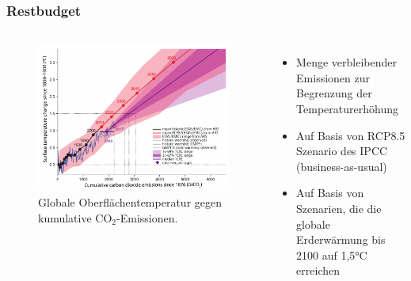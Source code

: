 \begin{frame}
  \frametitle{Restbudget}
  \begin{columns}
      \begin{figure}
        \centering
		    \includegraphics[width=\linewidth]{bilder/cumulative_co2.pdf}
		    \caption{Globale Oberflächentemperatur gegen kumulative CO$_2$-Emissionen.}
      \end{figure}
      \begin{itemize}
        \item Menge verbleibender Emissionen zur Begrenzung der Temperaturerhöhung
        \item Auf Basis von RCP8.5 Szenario des IPCC (business-as-usual)
        \item Auf Basis von Szenarien, die die globale Erderwärmung bis 2100 auf 1,5°C erreichen
      \end{itemize}
    \end{columns}
\end{frame}

